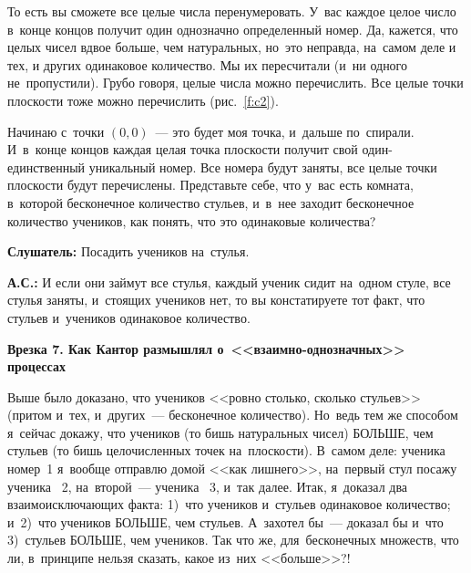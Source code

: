 

То есть вы сможете все целые числа перенумеровать. У~вас каждое целое число в~конце концов получит
один однозначно определенный номер. Да, кажется, что целых чисел вдвое больше, чем натуральных,
но~это неправда, на~самом деле и тех, и других одинаковое количество. Мы их пересчитали (и~ни
одного не~пропустили). Грубо говоря, целые числа можно перечислить. Все целые точки плоскости тоже
можно перечислить (рис.~\ref{f:c2}).



Начинаю с~точки $(0,0)$~--- это будет моя  точка, и~дальше по~спирали. И~в~конце концов
каждая целая точка плоскости получит свой один-единственный уникальный номер. Все номера будут
заняты, все целые точки плоскости будут перечислены. Представьте себе, что у~вас есть комната,
в~которой бесконечное количество стульев, и~в~нее заходит бесконечное количество учеников, как
понять, что это одинаковые количества?

\textbf{Слушатель:} Посадить учеников на~стулья.

\pagebreak

\textbf{А.С.:} И если они займут все стулья, каждый ученик сидит на~одном стуле, все стулья
заняты, и~стоящих учеников нет, то вы констатируете тот факт, что стульев и~учеников одинаковое
количество.

\medskip

\hrulefill

\smallskip

\textbf{Врезка 7. Как Кантор размышлял о~<<взаимно-од\-но\-знач\-ных>> процессах}

Выше было доказано, что учеников <<ровно столько, сколько стульев>> (притом и~тех, и~других~---
бесконечное количество). Но~ведь тем же способом я~сейчас докажу, что учеников (то бишь
натуральных чисел) БОЛЬШЕ, чем стульев (то бишь целочисленных точек на~плоскости). В~самом деле:
ученика номер~1 я~вообще отправлю домой <<как лишнего>>, на~первый стул посажу ученика \No~2,
на~второй~--- ученика \No~3, и~так далее. Итак, я~доказал два взаимоисключающих факта: 1)~что учеников
и~стульев одинаковое количество; и~2)~что учеников БОЛЬШЕ, чем стульев. А~захотел бы~--- доказал бы
и~что 3)~стульев БОЛЬШЕ, чем учеников. Так что же, для~бесконечных множеств, что ли, в~принципе
нельзя сказать, какое из~них <<больше>>?!

